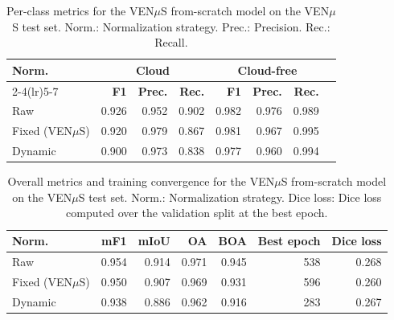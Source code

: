 \begin{table}[H]
\centering
\caption[Per-class metrics for the VEN$\mu$S from-scratch model.]{Per-class metrics for the VEN$\mu$S from-scratch model on the VEN$\mu$S test set. Norm.: Normalization strategy. Prec.: Precision. Rec.: Recall.}
\label{tab:scratch_perclass}
\small
\begin{tabular}{lrrrrrrr}
\toprule
\multirow{2}{*}{\textbf{Norm.}} & 
\multicolumn{3}{c}{\textbf{Cloud}} & 
\multicolumn{3}{c}{\textbf{Cloud-free}} \\
\cmidrule(lr){2-4}\cmidrule(lr){5-7}
& \textbf{F1} & \textbf{Prec.} & \textbf{Rec.} & 
\textbf{F1} & \textbf{Prec.} & \textbf{Rec.} \\
\midrule
Raw             & 0.926 & 0.952 & 0.902 & 0.982 & 0.976 & 0.989 \\
Fixed (VEN$\mu$S) & 0.920 & 0.979 & 0.867 & 0.981 & 0.967 & 0.995 \\
Dynamic         & 0.900 & 0.973 & 0.838 & 0.977 & 0.960 & 0.994 \\
\bottomrule
\end{tabular}
\end{table}

\begin{table}[H]
\centering
\caption[Overall metrics and training convergence for the VEN$\mu$S from-scratch model.]{Overall metrics and training convergence for the VEN$\mu$S from-scratch model on the VEN$\mu$S test set. Norm.: Normalization strategy. Dice loss: Dice loss computed over the validation split at the best epoch.}
\label{tab:scratch_overall}
\small
\begin{tabular}{lrrrrrr}
\toprule
\textbf{Norm.} & \textbf{mF1} & \textbf{mIoU} & 
\textbf{OA} & \textbf{BOA} & 
\textbf{Best epoch} & \textbf{Dice loss} \\
\midrule
Raw             & 0.954 & 0.914 & 0.971 & 0.945 & 538 & 0.268 \\
Fixed (VEN$\mu$S) & 0.950 & 0.907 & 0.969 & 0.931 & 596 & 0.260 \\
Dynamic         & 0.938 & 0.886 & 0.962 & 0.916 & 283 & 0.267 \\
\bottomrule
\end{tabular}
\end{table}

